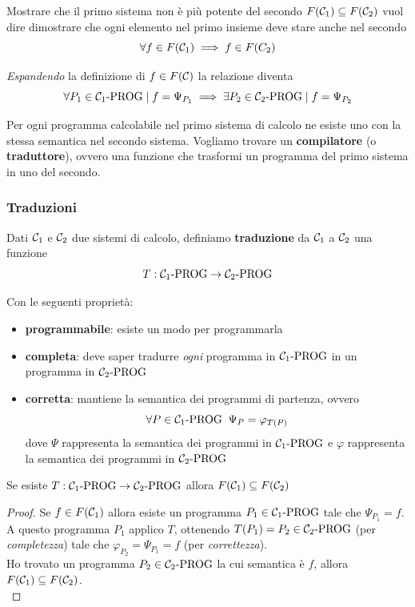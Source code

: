 Mostrare che il primo sistema non è più potente del secondo $F(\mathcal{C}_1) \subseteq F(\mathcal{C}_2)$ vuol dire dimostrare che ogni elemento nel primo insieme deve stare anche nel secondo
$$ \forall f \in F(\mathcal{C}_1) \implies f \in F(C_2) $$

\textit{Espandendo} la definizione di $f \in F(\mathcal{C})$ la relazione diventa
$$ \forall P_1 \in \mathcal{C}_{1}\text{-}\text{PROG} \mid f = \Psi_{P_1} \implies \exists P_2 \in \mathcal{C}_{2}\text{-}\text{PROG} \mid f = \Psi_{P_2} $$

Per ogni programma calcolabile nel primo sistema di calcolo ne esiste uno con la stessa semantica nel secondo sistema. Vogliamo trovare un \textbf{compilatore} (o \textbf{traduttore}), ovvero una funzione che trasformi un programma del primo sistema in uno del secondo.\\

\subsubsection{Traduzioni}
Dati $\mathcal{C}_1$ e $\mathcal{C}_2$ due sistemi di calcolo, definiamo \textbf{traduzione} da $\mathcal{C}_1$ a $\mathcal{C}_2$ una funzione
$$ T: \mathcal{C}_{1}\text{-}\text{PROG} \rightarrow \mathcal{C}_{2}\text{-}\text{PROG} $$

Con le seguenti proprietà:
\begin{itemize}
	\item \textbf{programmabile}: esiste un modo per programmarla
	\item \textbf{completa}: deve saper tradurre \textit{ogni} programma in $\mathcal{C}_{1}\text{-}\text{PROG}$ in un programma in $\mathcal{C}_{2}\text{-}\text{PROG}$
	\item \textbf{corretta}: mantiene la semantica dei programmi di partenza, ovvero
	$$ \forall P \in \mathcal{C}_{1}\text{-}\text{PROG} \;\; \Psi_P = \varphi_{T(P)}$$
	dove $\Psi$ rappresenta la semantica dei programmi in $\mathcal{C}_{1}\text{-}\text{PROG}$ e $\varphi$ rappresenta la semantica dei programmi in $\mathcal{C}_{2}\text{-}\text{PROG}$\\
\end{itemize}


\begin{theor}
	Se esiste $T: \mathcal{C}_{1}\text{-}\text{PROG} \rightarrow \mathcal{C}_{2}\text{-}\text{PROG}$ allora $F(\mathcal{C}_1) \subseteq F(\mathcal{C}_2)$
\end{theor}
\begin{proof}
	Se $f \in F(\mathcal{C}_1)$ allora esiste un programma $P_1 \in \mathcal{C}_{1}\text{-}\text{PROG}$ tale che $\Psi_{P_1} = f$.\\
	
	A questo programma $P_1$ applico $T$, ottenendo $T(P_1) = P_2 \in \mathcal{C}_{2}\text{-}\text{PROG}$ (per \textit{completezza}) tale che $\varphi_{P_2} = \Psi_{P_1} = f$ (per \textit{correttezza}).\\
	
	Ho trovato un programma $P_2 \in \mathcal{C}_{2}\text{-}\text{PROG}$ la cui semantica è $f$, allora $F(\mathcal{C}_1) \subseteq F(\mathcal{C}_2)$.\\
\end{proof}

